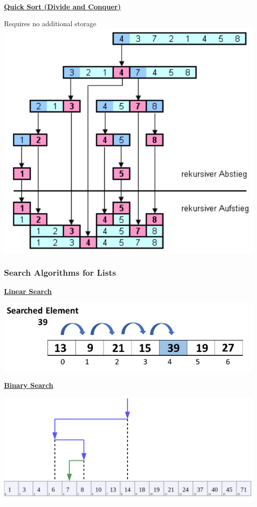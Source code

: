     {\centering\underline{\textbf{Quick Sort (Divide and Conquer)}} \par}
        Requires no additional storage\\
        \includegraphics[width = \linewidth]{src/3_containers/images/quicksort.png}
          
        

\subsubsection{Search Algorithms for Lists}
    {\centering\underline{\textbf{Linear Search}} \par}
        \includegraphics*[width = 0.8\linewidth]{src/3_containers/images/linear_search.png}
        

    {\centering\underline{\textbf{Binary Search}} \par}
        \includegraphics*[width = 0.8\linewidth]{src/3_containers/images/binary_search.png}
        
